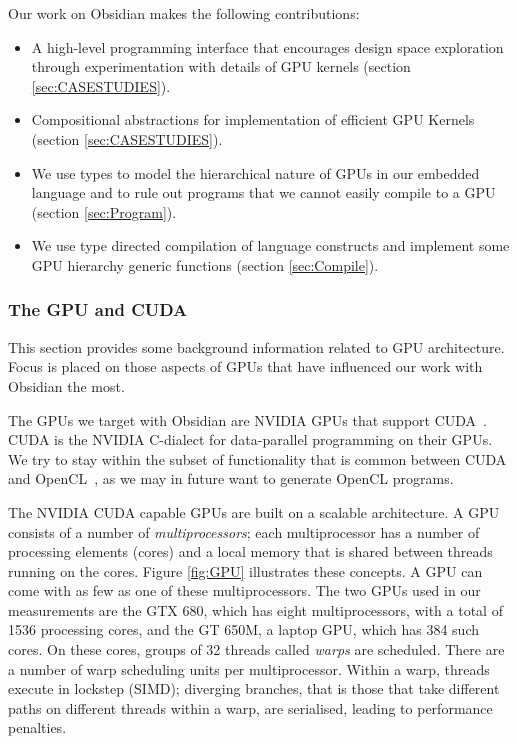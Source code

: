 Our work on Obsidian makes the following contributions: 
\begin{itemize} 
  \item A high-level programming interface that encourages design space exploration through experimentation with 
    details of GPU kernels (section \ref{sec:CASESTUDIES}).
  \item Compositional abstractions for implementation of efficient GPU 
    Kernels (section \ref{sec:CASESTUDIES}).
  \item We use types to model the hierarchical nature of GPUs in our embedded 
    language and to rule out programs that we cannot easily compile to a GPU (section \ref{sec:Program}).
  \item We use type directed compilation of language constructs and 
    implement some GPU hierarchy generic functions (section \ref{sec:Compile}).
\end{itemize} 


\subsubsection{The GPU and CUDA}
\label{sec:GPU}

This section provides some background information related to GPU architecture. 
Focus is placed on those aspects of GPUs that have influenced our work with 
Obsidian the most. 

The GPUs we target with Obsidian are NVIDIA GPUs that support CUDA~.
CUDA is the NVIDIA C-dialect for data-parallel programming on their GPUs. 
We try to stay within the subset of functionality that is common 
between CUDA and OpenCL~, as we may in future want to generate 
OpenCL programs. 

The NVIDIA CUDA capable GPUs are built on a scalable architecture. A GPU 
consists of a number of {\em multiprocessors}; each multiprocessor has a 
number of processing elements (cores) and a local memory that is shared 
between threads running on the cores. Figure \ref{fig:GPU} illustrates these 
concepts. A GPU can come with as few as one of these multiprocessors.
The two GPUs used in our measurements are the GTX 680, which has eight 
multiprocessors, with a total of 1536 processing cores, and the GT 650M, a 
laptop GPU, which has 384 such cores. On these cores, groups of 32 threads 
called {\em warps} are scheduled. There are a number of warp scheduling units 
per multiprocessor. Within a warp, threads execute in lockstep (SIMD); 
diverging branches, that is those that take different paths on different 
threads within a warp, are serialised, leading to performance penalties. 

